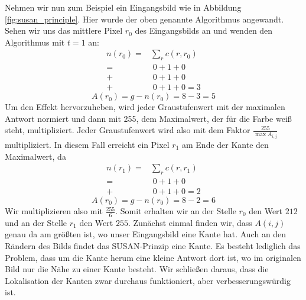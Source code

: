 \documentclass[a4paper, 11pt]{report}
\theoremstyle{definition}
\begin{document}
			Nehmen wir nun zum Beispiel ein Eingangsbild wie in Abbildung \ref{fig:susan_principle}. Hier wurde der oben genannte Algorithmus angewandt.
			Sehen wir uns das mittlere Pixel $r_0$ des Eingangsbilds an und wenden den Algorithmus mit $t=1$ an:
			\begin{align*}
				n(r_0) 	=&\sum_r c(r,r_0) \\
						=&\; 0 + 1 + 0 \\
						+&\; 0 + 1 + 0 \\
						+&\; 0 + 1 + 0 = 3
			\end{align*}
			$$ A(r_0) = g - n(r_0) = 8 - 3 = 5 $$
			Um den Effekt hervorzuheben, wird jeder Graustufenwert mit der maximalen Antwort normiert und dann mit 255, dem Maximalwert, der für die Farbe weiß steht, multipliziert. Jeder Graustufenwert wird also mit dem Faktor $\frac{255}{\max{A_{i,j}}}$ multipliziert. In diesem Fall erreicht ein Pixel $r_1$ am Ende der Kante den Maximalwert, da
			\begin{align*}
				n(r_1) 	=&\sum_r c(r,r_1) \\
						=&\; 0 + 1 + 0 \\
						+&\; 0 + 1 + 0 = 2
			\end{align*}
			$$ A(r_0) = g - n(r_0) = 8 - 2 = 6 $$
			Wir multiplizieren also mit $\frac{255}{6}$. Somit erhalten wir an der Stelle $r_0$ den Wert $212$ und an der Stelle $r_1$ den Wert $255$.
			Zunächst einmal finden wir, dass $A(i,j)$ genau da am größten ist, wo unser Eingangsbild eine Kante hat. Auch an den Rändern des Bilds findet das SUSAN-Prinzip eine Kante. Es besteht lediglich das Problem, dass um die Kante herum eine kleine Antwort dort ist, wo im originalen Bild nur die Nähe zu einer Kante besteht. Wir schließen daraus, dass die Lokalisation der Kanten zwar durchaus funktioniert, aber verbesserungswürdig ist.
\end{document}
